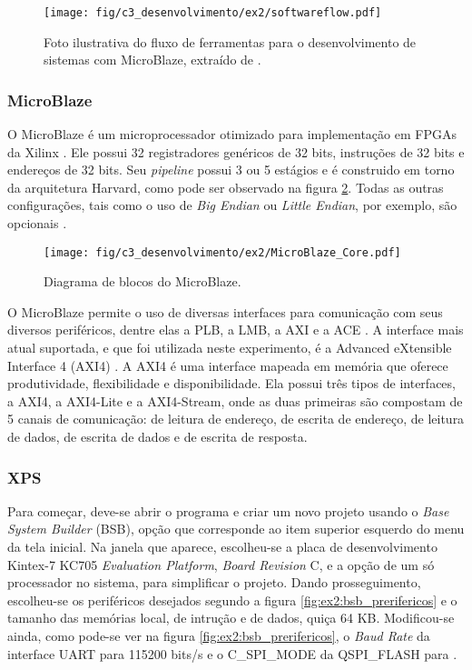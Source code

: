 \documentclass[11pt,a4paper,oneside]{book}
\begin{document}
\begin{figure}[htp]
\centering
\texttt{[image: fig/c3\_desenvolvimento/ex2/softwareflow.pdf]}
\caption{Foto ilustrativa do fluxo de ferramentas para o desenvolvimento de sistemas com MicroBlaze, extraído de \cite{ug081}.}
\label{fig:ex2:softwareflow}
\end{figure}

\subsubsection{MicroBlaze}
O MicroBlaze é um microprocessador otimizado para implementação em FPGAs da Xilinx \cite{ug081}.
Ele possui 32 registradores genéricos de 32 bits, instruções de 32 bits e endereços de 32 bits.
Seu \textit{pipeline} possui 3 ou 5 estágios e é construido em torno da arquitetura Harvard, como pode ser observado na figura \ref{fig:ex3:microblazecore}.
Todas as outras configurações, tais como o uso de \textit{Big Endian} ou \textit{Little Endian}, por exemplo, são opcionais \cite{ug081}.

\begin{figure}[h]
\centering
\texttt{[image: fig/c3\_desenvolvimento/ex2/MicroBlaze\_Core.pdf]}
\caption{Diagrama de blocos do MicroBlaze.}
\label{fig:ex3:microblazecore}
\end{figure}

O MicroBlaze permite o uso de diversas interfaces para comunicação com seus diversos periféricos, dentre elas a PLB, a LMB, a AXI e a ACE \cite{ug081}.
A interface mais atual suportada, e que foi utilizada neste experimento, é a Advanced eXtensible Interface 4 (AXI4) \cite{ug081, ug761}.
A AXI4 é uma interface mapeada em memória que oferece produtividade, flexibilidade e disponibilidade.
Ela possui três tipos de interfaces, a AXI4, a AXI4-Lite e a AXI4-Stream, onde as duas primeiras são compostam de 5 canais de comunicação: de leitura de endereço, de escrita de endereço, de leitura de dados, de escrita de dados e de escrita de resposta.

\subsubsection{XPS}
Para começar, deve-se abrir o programa e criar um novo projeto usando o \textit{Base System Builder} (BSB), opção que corresponde ao item superior esquerdo do menu da tela inicial.
Na janela que aparece, escolheu-se a placa de desenvolvimento Kintex-7 KC705 \textit{Evaluation Platform}, \textit{Board Revision} C, e a opção de um só processador no sistema, para simplificar o projeto.
Dando prosseguimento, escolheu-se os periféricos desejados segundo a figura \ref{fig:ex2:bsb_prerifericos} e o tamanho das memórias local, de intrução e de dados, quiça 64 KB.
Modificou-se ainda, como pode-se ver na figura \ref{fig:ex2:bsb_prerifericos}, o \textit{Baud Rate} da interface UART para 115200 bits/s e o C\_SPI\_MODE da QSPI\_FLASH para .
\end{document}
